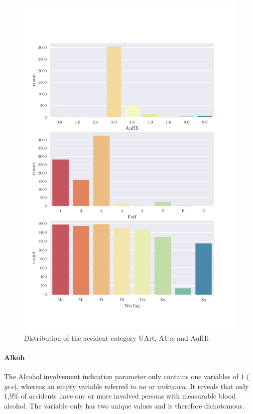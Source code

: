 \clearpage
\begin{figure}[!ht]
	\centering
	\includegraphics[scale=0.7, trim=0cm 1.5cm 0cm 1cm]{CorrAnalysis/data/BAYSIS/01_dataset/plots/baysis_dataset_count_multiple02}
	\caption{Distribution of the accident category UArt, AUrs and AufHi}
	\label{img:baysis_dataset_UArt_AUrs_AufHi}
\end{figure}
\clearpage

\paragraph{Alkoh}
The Alcohol involvement indication parameter only contains one variables of $1$ ($yes$), whereas an empty variable referred to $no$ or $unknown$. It reveals that only 1,9\% of accidents have one or more involved persons with measurable blood alcohol. The variable only has two unique values and is therefore dichotomous.

